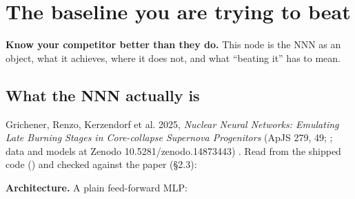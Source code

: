 %
%

\section{The baseline you are trying to beat}
\label{part:baseline}

\textbf{Know your competitor better than they do.} This node is the NNN as an
object, what it achieves, where it does not, and what ``beating it'' has to
mean.

\subsection{What the NNN actually is}
\label{sec:nnnis}

Grichener, Renzo, Kerzendorf et al. 2025, \emph{Nuclear Neural Networks:
Emulating Late Burning Stages in Core-collapse Supernova Progenitors} (ApJS
279, 49; ; data and models at Zenodo 10.5281/zenodo.14873443)
\citep{grichener2025}. Read from the shipped code
() and checked against the
paper (\S 2.3):

\textbf{Architecture.} A plain feed-forward MLP:

